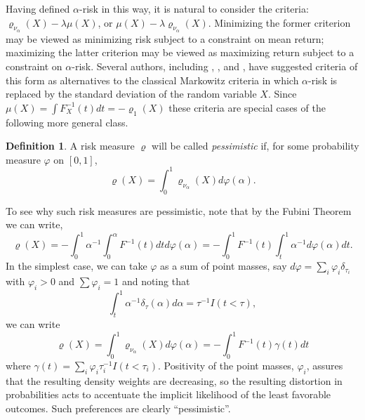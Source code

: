 \documentclass{birkart}
\theoremstyle{definition}
\newtheorem{defn}[theorem]{Definition}
\theoremstyle{remark}
\numberwithin{equation}{section}
\begin{document}
Having defined $\alpha$-risk in this way, it is natural to consider the
criteria: $\varrho_{\nu_\alpha} (X) - \lambda \mu (X)$, or
$\mu(X) - \lambda \varrho_{\nu_\alpha} (X).$
Minimizing the former criterion may be viewed
as minimizing risk subject to a constraint on mean return;
maximizing the latter criterion may be viewed as maximizing return
subject to a constraint on $\alpha$-risk.
Several authors, including
, , and ,
have suggested criteria of this form as alternatives to the classical
Markowitz criteria in which $\alpha$-risk is replaced by the standard
deviation of the random variable $X$.
Since $\mu(X) = \int F_X^{-1} (t) dt = - \varrho_1 (X)$ these criteria
are special cases of the following more general class.
\begin{defn} A risk measure $\varrho$ will be called {\it pessimistic}
if, for some probability measure $\varphi$ on $[0,1]$,
\[
\varrho (X) = 
\int_0^1 \varrho_{\nu_\alpha} (X) d \varphi (\alpha).
\]
\end{defn}
To see why such risk measures are pessimistic,
note that by the  Fubini Theorem we can write,
\[
\varrho (X) = - \int_0^1 \alpha^{-1} 
\int_0^\alpha F^{-1} (t) dt d \varphi (\alpha)
= - \int_0^1 F^{-1} (t) \int_t^1  \alpha^{-1}  d \varphi (\alpha) dt.
\]
In the simplest case, we can take $\varphi$ as a sum of  point masses, 
say $d\varphi = \sum_i \varphi_i \delta_{\tau_i}$ with
$\varphi_i >0$ and $\sum \varphi_i = 1$ and noting that 
\[
\int_t^1 \alpha^{-1} \delta_\tau (\alpha) d \alpha = \tau^{-1} I(t < \tau),
\]
we can write 
\[
\varrho (X) = 
\int_0^1 \varrho_{\nu_\alpha} (X) d \varphi (\alpha)
= - \int_0^1  F^{-1} (t) \gamma(t) dt 
\]
where $\gamma(t) = \sum_i \varphi_i \tau_i^{-1} I(t < \tau_i)$.
Positivity of the point masses, $\varphi_i$,
assures that the resulting density weights are decreasing, so the
resulting distortion in probabilities acts to accentuate the implicit
likelihood of the least favorable outcomes.
Such preferences are clearly ``pessimistic''.  
\end{document}
